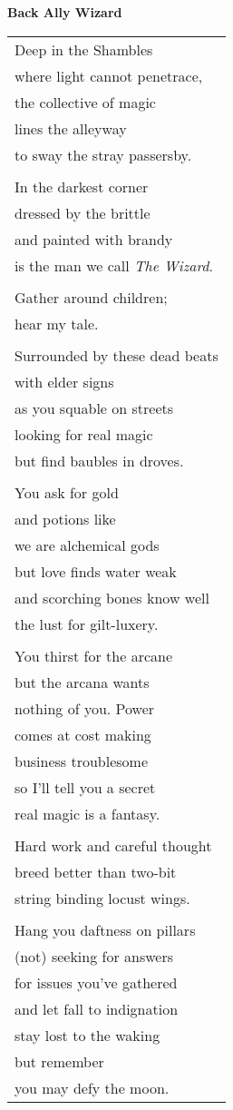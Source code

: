 \documentclass{article}
\begin{document}
\begin{center}
\textbf{Back Ally Wizard} \\
\vspace*{2ex}
\begin{tabular}{l}
Deep in the Shambles \\
where light cannot penetrace, \\
the collective of magic \\
lines the alleyway \\
to sway the stray passersby. \\
\\
In the darkest corner \\
dressed by the brittle \\
and painted with brandy \\
is the man we call \textit{The Wizard}. \\
\\
Gather around children; \\
hear my tale. \\
\\
Surrounded by these dead beats \\
with elder signs \\
as you squable on streets \\
looking for real magic \\
but find baubles in droves. \\
\\
You ask for gold \\
and potions like \\
we are alchemical gods \\
but love finds water weak \\
and scorching bones know well \\
the lust for gilt-luxery. \\
\\
You thirst for the arcane \\
but the arcana wants \\
nothing of you.  Power \\
comes at cost making \\
business troublesome \\
so I'll tell you a secret \\
real magic is a fantasy. \\
\\
Hard work and careful thought \\
breed better than two-bit \\
string binding locust wings. \\
\\
Hang you daftness on pillars \\
(not) seeking for answers \\
for issues you've gathered \\
and let fall to indignation \\
stay lost to the waking \\
but remember \\
you may defy the moon. \\
\end{tabular}
\end{center}
\end{document}
